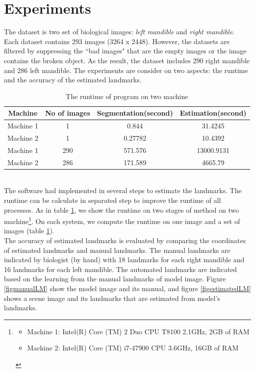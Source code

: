 \section{Experiments}
The dataset is two set of biological images: \textit{left mandible} and \textit{right mandible}. Each dataset contains 293 images (3264 x 2448). However, the datasets are filtered by suppressing the ``bad images" that are the empty images or the image contains the broken object. As the result, the dataset includes 290 right mandible and 286 left mandible. The experiments are consider on two aspects: the runtime and the accuracy of the estimated landmarks.\\[0.2cm]
\begin{table}[!h]
	\centering
	\begin{tabular}{|c|c|c|c|}
		\hline
		Machine & No of images & Segmentation(second) & Estimation(second) \\ \hline
		Machine 1 & 1 & 0.844 & 31.4245   \\ \hline
		Machine 2 & 1 & 0.27782 & 10.4392 \\ \hline
		Machine 1 & 290 & 571.576 & 13000.9131   \\ \hline
		Machine 2 & 286 & 171.589 & 4665.79\\ \hline
	\end{tabular}	
	\caption{The runtime of program on two machine}		
	\label{table_runtime}
\end{table}~\\[0.2cm]
The software had implemented in several steps to estimate the landmarks. The runtime can be calculate in separated step to improve the runtime of all processes. As in table \ref{table_runtime}, we show the runtime on two stages of method on two machine\footnote{
	\begin{itemize}
		\item Machine 1: Intel(R) Core (TM) 2 Duo CPU T8100 2.1GHz, 2GB of RAM
		\item Machine 2: Intel(R) Core (TM) i7-47900 CPU 3.6GHz, 16GB of RAM
	\end{itemize}
}. On each system, we compute the runtime on one image and a set of images (table \ref{table_runtime}).\\[0.2cm]
The accuracy of estimated landmarks is evaluated by comparing the coordinates of estimated landmarks and manual landmarks. The manual landmarks are indicated by biologist (by hand) with 18 landmarks for each right mandible and 16 landmarks for each left mandible. The automated landmarks are indicated based on the learning from the manual landmarks of model image. Figure \ref{figmanualLM} show the model image and its manual, and figure \ref{figestimatedLM} shows a scene image and its landmarks that are estimated from model's landmarks. 
